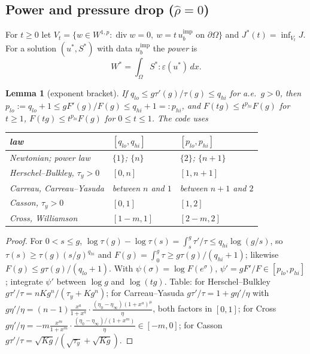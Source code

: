 \documentclass[11pt]{article}
\newtheorem{lemma}[theorem]{Lemma}
\theoremstyle{definition}
\newcommand{\eps}{\varepsilon}
\begin{document}
\subsection*{Power and pressure drop ($\hat\rho=0$)}

For $t\ge0$ let $V_t=\{w\in W^{1,p}:\operatorname{div}w=0,\ w=t\,u_b^{\mathrm{imp}}\text{ on }\partial\Omega\}$ and
$J^*(t)=\inf_{V_t}J$. For a solution $(u^*,S^*)$ with data $u_b^{\mathrm{imp}}$ the \emph{power} is
\[
W^*=\int_\Omega S^*:\eps(u^*)\,dx .
\]

\begin{lemma}[exponent bracket]\label{lem:pbracket}
If $q_{lo}\le g\tau'(g)/\tau(g)\le q_{hi}$ for a.e.\ $g>0$, then $p_{lo}:=q_{lo}+1\le gF'(g)/F(g)\le q_{hi}+1=:p_{hi}$, and
$F(tg)\le t^{p_{hi}}F(g)$ for $t\ge1$, $F(tg)\le t^{p_{lo}}F(g)$ for $0\le t\le1$. The code uses
\begin{center}\small
\begin{tabular}{lll}\toprule
law & $[q_{lo},q_{hi}]$ & $[p_{lo},p_{hi}]$\\\midrule
Newtonian; power law & $\{1\}$; $\{n\}$ & $\{2\}$; $\{n+1\}$\\
Herschel--Bulkley, $\tau_y>0$ & $[0,n]$ & $[1,n+1]$\\
Carreau, Carreau--Yasuda & between $n$ and $1$ & between $n+1$ and $2$\\
Casson, $\tau_y>0$ & $[0,1]$ & $[1,2]$\\
Cross, Williamson & $[1-m,1]$ & $[2-m,2]$\\\bottomrule
\end{tabular}
\end{center}
\end{lemma}
\begin{proof}
For $0<s\le g$, $\log\tau(g)-\log\tau(s)=\int_s^g\tau'/\tau\le q_{hi}\log(g/s)$, so $\tau(s)\ge\tau(g)(s/g)^{q_{hi}}$ and
$F(g)=\int_0^g\tau\ge g\tau(g)/(q_{hi}+1)$; likewise $F(g)\le g\tau(g)/(q_{lo}+1)$. With $\psi(\sigma)=\log F(e^\sigma)$,
$\psi'=gF'/F\in[p_{lo},p_{hi}]$; integrate $\psi'$ between $\log g$ and $\log(tg)$. Table: for Herschel--Bulkley
$g\tau'/\tau=nKg^n/(\tau_y+Kg^n)$; for Carreau--Yasuda $g\tau'/\tau=1+g\eta'/\eta$ with
$g\eta'/\eta=(n-1)\frac{x^a}{1+x^a}\cdot\frac{(\eta_0-\eta_\infty)(1+x^a)^{\mu}}{\eta}$, both factors in $[0,1]$; for Cross
$g\eta'/\eta=-m\frac{x^m}{1+x^m}\cdot\frac{(\eta_0-\eta_\infty)/(1+x^m)}{\eta}\in[-m,0]$; for Casson
$g\tau'/\tau=\sqrt{Kg}/(\sqrt{\tau_y}+\sqrt{Kg})$.
\end{proof}
\end{document}
